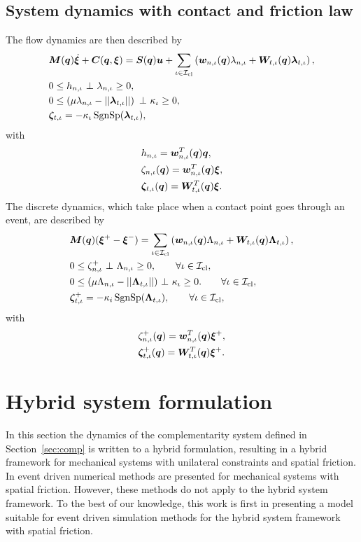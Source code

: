 \documentclass[../DC2017114Bouma.tex]{subfiles}
\begin{document}
\subsection{System dynamics with contact and friction law}
The flow dynamics are then described by
\begin{align}
&\Mb(\qb)\dot{\xib} + \Cb(\qb,\xib) = \Sb(\qb)\ub + \sum_{\iota\in\Ic_{\text{cl}}}\left(\wb_{n,\iota}(\qb)\lambda_{n,\iota} + \Wb_{t,\iota}(\qb)\lambdab_{t,\iota} \right), \label{eq:ncpcontact1}\\
&0\leq h_{n,\iota}\ \bot\ \lambda_{n,\iota} \geq 0,\label{eq:ncpcontact2}\\
&0\leq \left(\mu\lambda_{n,\iota} - ||\lambdab_{t,\iota}||\right)\ \bot\ \kappa_{\iota} \geq 0,\label{eq:ncpcontact3}\\
&\zetab_{t,\iota} = -\kappa_{\iota}\SgnSp(\lambdab_{t,\iota}),\label{eq:ncpcontact4}
\end{align}
with 
\begin{align}
&h_{n,\iota} = {\boldsymbol{w}}_{n,\iota}^T({\boldsymbol{q}}){\boldsymbol{q}},\label{eq:h}\\
&\zeta_{n,\iota}({\boldsymbol{q}}) = {\boldsymbol{w}}^T_{n,\iota}({\boldsymbol{q}}) \boldsymbol{\xi},  \label{eq:zetan}\\
&\boldsymbol{\zeta}_{t,\iota}({\boldsymbol{q}}) = {\boldsymbol{W}}^T_{t,\iota}({\boldsymbol{q}}) \boldsymbol{\xi}. \label{eq:zetab}
\end{align}
The discrete dynamics, which take place when a contact point goes through an event, are described by
\begin{align}
&\Mb(\qb)(\xib^+ - \xib^-) = \sum_{\iota\in\Ic_{\text{cl}}}\left( \wb_{n,\iota}(\qb)\Lambda_{n,\iota} + \Wb_{t,\iota}(\qb)\Lambdab_{t,\iota}\right), \label{eq:ncpimpact1}\\
&0\leq \zeta_{n,\iota}^+\ \bot\ \Lambda_{n,\iota} \geq 0, \qquad \forall \iota\in\Ic_{\text{cl}},\label{eq:ncpimpact2}\\
&0 \leq (\mu\Lambda_{n,\iota} - ||\Lambdab_{t,\iota}||)\ \bot\ \kappa_{\iota} \geq 0. \qquad \forall \iota\in\Ic_{\text{cl}},\label{eq:ncpimpact3}\\
&\zetab_{t,\iota}^+ = -\kappa_i\SgnSp(\Lambdab_{t,\iota}),\qquad \forall \iota\in\Ic_{\text{cl}},\label{eq:ncpimpact4}
\end{align}
with 
\begin{align}
&\zeta^+_{n,\iota}({\boldsymbol{q}}) = {\boldsymbol{w}}^T_{n,\iota}({\boldsymbol{q}}) \boldsymbol{\xi}^+,\\
&\boldsymbol{\zeta}^+_{t,\iota}({\boldsymbol{q}}) = {\boldsymbol{W}}^T_{t,\iota}({\boldsymbol{q}}) \boldsymbol{\xi}^+.\label{eq:ncpimpactend}
\end{align}

\section{Hybrid system formulation}
In this section the dynamics of the complementarity system defined in Section~\ref{sec:comp} is written to a hybrid formulation, resulting in a hybrid framework for mechanical systems with unilateral constraints and spatial friction. In \cite{Acary2008} event driven numerical methods are presented for mechanical systems with spatial friction. However, these methods do not apply to the hybrid system framework. To the best of our knowledge, this work is first in presenting a model suitable for event driven simulation methods for the hybrid system framework with spatial friction.
\end{document}
